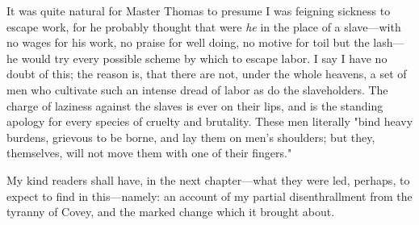 It was quite natural for Master Thomas to presume I was feigning
sickness to escape work, for he probably thought that were \emph{he} in
the place of a slave---with no wages for his work, no praise for well
doing, no motive for toil but the lash---he would try every possible
scheme by which to escape labor. I say I have no doubt of this; the
reason is, that there are not, under the whole heavens, a set of men who
cultivate such an intense dread of labor as do the slaveholders. The
charge of laziness against the slaves is ever on their lips, and is the
standing apology for every species of cruelty and brutality. These men
literally "bind heavy burdens, grievous to be borne, and lay them {}on
men's shoulders; but they, themselves, will not move them with one of
their fingers."

My kind readers shall have, in the next chapter---what they were led,
perhaps, to expect to find in this---namely: an account of my partial
disenthrallment from the tyranny of Covey, and the marked change which
it brought about.
